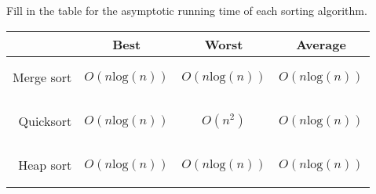 Fill in the table for the asymptotic running time of each sorting
      algorithm.
      \begin{center}
      \begin{tabular}{|r|c|c|c|}
        \hline
        ~ & Best & Worst & Average \\\hline
        Merge sort &
            \begin{answer}$O(n\textrm{log}(n))$\end{answer} &
            \begin{answer}$O(n\textrm{log}(n))$\end{answer} &
            \begin{answer}$O(n\textrm{log}(n))$\end{answer} \\\hline
        Quicksort &
            \begin{answer}$O(n\textrm{log}(n))$\end{answer} &
            \begin{answer}$O(n^2)$\end{answer} &
            \begin{answer}$O(n\textrm{log}(n))$\end{answer} \\\hline
        Heap sort &
            \begin{answer}$O(n\textrm{log}(n))$\end{answer} &
            \begin{answer}$O(n\textrm{log}(n))$\end{answer} &
            \begin{answer}$O(n\textrm{log}(n))$\end{answer} \\\hline
      \end{tabular}
      \end{center}
